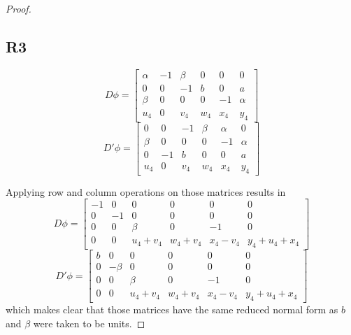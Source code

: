 \begin{proof}
  \subsection*{\centering R3}

  $$D\phi=
  \begin{bmatrix}
    \alpha & -1 & \beta & 0 & 0 & 0 \\ 
    0 & 0 & -1 & b & 0 & a \\ 
    \beta & 0 & 0 & 0 & -1 & \alpha \\ 
    u_4 & 0 & v_4 & w_4 & x_4 & y_4
  \end{bmatrix}
  $$
  $$D'\phi=
  \begin{bmatrix}
    0 & 0 & -1 & \beta & \alpha & 0 \\ 
    \beta & 0 & 0 & 0 & -1 & \alpha \\ 
    0 & -1 & b & 0 & 0 & a\\ 
    u_4 & 0 & v_4 & w_4 & x_4 & y_4
  \end{bmatrix}
  $$

  Applying row and column operations on those matrices results in 
  $$
  D\phi=
  \begin{bmatrix}
    -1 & 0 & 0 & 0 & 0 & 0 \\
    0 & -1 & 0 & 0 & 0 & 0 \\ 
    0 & 0 & \beta & 0 & -1 & 0 \\ 
    0 & 0 & u_4+v_4 & w_4+v_4 & x_4-v_4 & y_4+u_4+x_4
  \end{bmatrix}
  $$
  $$
  D'\phi=
  \begin{bmatrix}
    b & 0 & 0 & 0 & 0 & 0 \\
    0 & -\beta & 0 & 0 & 0 & 0 \\ 
    0 & 0 & \beta & 0 & -1 & 0 \\ 
    0 & 0 & u_4+v_4 & w_4+v_4 & x_4-v_4 & y_4+u_4+x_4
  \end{bmatrix}
  $$
  which makes clear that those matrices have the same reduced normal form as $b$ and $\beta$ were taken to be units.

\end{proof}
